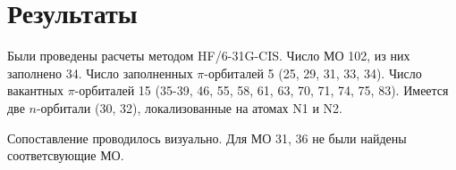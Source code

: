 \section{Результаты}
Были проведены расчеты методом HF/6-31G-CIS. Число МО 102, из них заполнено 34. Число заполненных $\pi$-орбиталей 5 (25, 29, 31, 33, 34). Число вакантных $\pi$-орбиталей 15 (35-39, 46, 55, 58, 61, 63, 70, 71, 74, 75, 83). Имеется две $n$-орбитали (30, 32), локализованные на атомах N1 и N2.
\begin{table}[H]
    \caption{Сопоставление молекулярных орбиталей, полученных разными методами}
    \begin{center}
    \label{tab:my-table}
    \end{center}{}
\end{table}

Сопоставление проводилось визуально. Для МО 31, 36 не были найдены соответсвующие МО.

